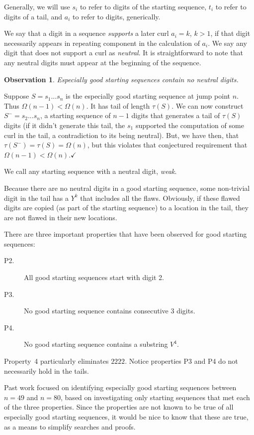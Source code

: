 \documentclass[11pt]{article}
\def\emph#1{{\em #1\/}}
\def\term#1{\emph{#1}}
\def\QED{$\checkmark$}
\def\ni{\noindent}
\def\tail#1{{\tau(#1)}}
\def\om#1{{\Omega(#1)}}
\newtheorem{obs}{Observation}
\def\Proof{\ni{\bf Proof:} }
\begin{document}
Generally, we will use $s_i$ to refer to digits of the starting sequence, $t_i$ to refer to digits of a tail, and $a_i$ to refer to digits, generically.

We say that a digit in a sequence \term{supports} a later curl $a_i=k$, $k>1$,
if that digit necessarily appears in repeating component in the calculation of
$a_i$.  We say any digit that does not support a curl as \term{neutral}.  It
is straightforward to note that any neutral digits must appear at the
beginning of the sequence.

\begin{obs} Especially good starting sequences contain no neutral digits.
\end{obs}
\Proof Suppose $S=s_1...s_n$ is the especially good starting sequence at jump point $n$.  Thus $\om{n-1}<\om{n}$.  It has tail of length
$\tail{S}$.  We can now construct $S^-=s_2...s_n$, a starting sequence of $n-1$ digits that generates
a tail of $\tail{S}$ digits (if it didn't generate this tail, the $s_1$ supported the computation of
some curl in the tail, a contradiction to its being neutral). But, we have then, that 
$\tail{S^-}=\tail{S}=\om{n}$, but this violates that conjectured requirement that $\om{n-1}<\om{n}$.\QED

We call any starting sequence with a neutral digit, \term{weak}.

Because there are no neutral digits in a good starting sequence, some
non-trivial digit in the tail has a $Y^k$ that includes all the flaws.
Obviously, if these flawed digits are copied (as part of the starting
sequence) to a location in the tail, they are not flawed in their new
locations.

There are three important properties that have been observed for good
starting sequences:
\begin{description}
\item[P2.]  All good starting sequences start with digit 2.
\item[P3.]  No good starting sequence contains consecutive 3 digits.
\item[P4.]  No good starting sequence contains a substring $V^4$.
\end{description}
\ni Property~4 particularly eliminates $2222$.  Notice properties P3 and P4
do not necessarily hold in the tails.

Past work focused on identifying especially good starting sequences between
$n=49$ and $n=80$, based on investigating only starting sequences that met
each of the three properties.  Since the properties are not known to be true
of all especially good starting sequences, it would be nice to know that these
are true, as a means to simplify searches and proofs.
\end{document}
